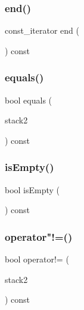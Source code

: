 \mbox{\label{classStack_accf9a4bd0c34d4a5f6a7dab66ea10cdc}} 
\subsubsection{\texorpdfstring{end()}{end()}\hspace{0.1cm}{\footnotesize\ttfamily [2/2]}}
{\footnotesize\ttfamily const\+\_\+iterator end (\begin{DoxyParamCaption}{ }\end{DoxyParamCaption}) const\hspace{0.3cm}{\ttfamily [inline]}}

\mbox{\label{classStack_a8a06f9a4f35024fe7f29b0f87dd9a711}} 
\subsubsection{\texorpdfstring{equals()}{equals()}}
{\footnotesize\ttfamily bool equals (\begin{DoxyParamCaption}\item[{const \mbox{\hyperlink{classStack}{Stack}}$<$ Value\+Type $>$ \&}]{stack2 }\end{DoxyParamCaption}) const}

\mbox{\label{classStack_acf82f9b2937375c7b1cf3dccb3df3312}} 
\subsubsection{\texorpdfstring{is\+Empty()}{isEmpty()}}
{\footnotesize\ttfamily bool is\+Empty (\begin{DoxyParamCaption}{ }\end{DoxyParamCaption}) const}

\mbox{\label{classStack_a21017a086067b8ac1c21c3bdef97a100}} 
\subsubsection{\texorpdfstring{operator"!=()}{operator!=()}}
{\footnotesize\ttfamily bool operator!= (\begin{DoxyParamCaption}\item[{const \mbox{\hyperlink{classStack}{Stack}}$<$ Value\+Type $>$ \&}]{stack2 }\end{DoxyParamCaption}) const}

